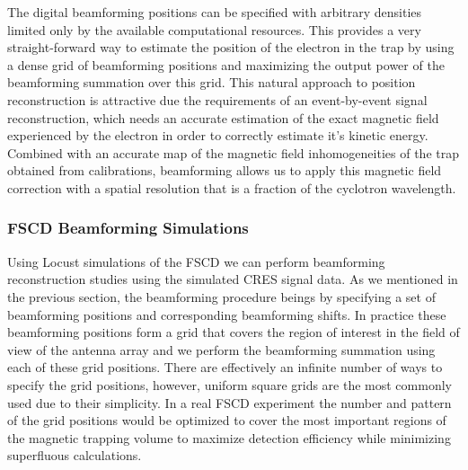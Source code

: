 The digital beamforming positions can be specified with arbitrary densities limited only by the available computational resources. This provides a very straight-forward way to estimate the position of the electron in the trap by using a dense grid of beamforming positions and maximizing the output power of the beamforming summation over this grid. This natural approach to position reconstruction is attractive due the requirements of an event-by-event signal reconstruction, which needs an accurate estimation of the exact magnetic field experienced by the electron in order to correctly estimate it's kinetic energy. Combined with an accurate map of the magnetic field inhomogeneities of the trap obtained from calibrations, beamforming allows us to apply this magnetic field correction with a spatial resolution that is a fraction of the cyclotron wavelength.

\subsubsection*{FSCD Beamforming Simulations}

Using Locust simulations of the FSCD we can perform beamforming reconstruction studies using the simulated CRES signal data. As we mentioned in the previous section, the beamforming procedure beings by specifying a set of beamforming positions and corresponding beamforming shifts. In practice these beamforming positions form a grid that covers the region of interest in the field of view of the antenna array and we perform the beamforming summation using each of these grid positions. There are effectively an infinite number of ways to specify the grid positions, however, uniform square grids are the most commonly used due to their simplicity. In a real FSCD experiment the number and pattern of the grid positions would be optimized to cover the most important regions of the magnetic trapping volume to maximize detection efficiency while minimizing superfluous calculations.

